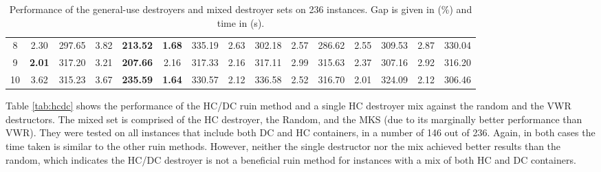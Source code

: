 \documentclass[preprint,11pt,3p]{elsarticle}
\begin{document}
\begin{table}[ht]
{\begin{tabular}{c c c c c c c c c c c c c c c}
    8 & 2.30 & 297.65 & 3.82 & \textbf{213.52} & \textbf{1.68} & 335.19 & 2.63 & 302.18 & 2.57 & 286.62 & 2.55 & 309.53 & 2.87 & 330.04 \\
    9 & \textbf{2.01} & 317.20 & 3.21 & \textbf{207.66} & 2.16 & 317.33 & 2.16 & 317.11 & 2.99 & 315.63 & 2.37 & 307.16 & 2.92 & 316.20 \\
    10 & 3.62 & 315.23 & 3.67 & \textbf{235.59} & \textbf{1.64} & 330.57 & 2.12 & 336.58 & 2.52 & 316.70 & 2.01 & 324.09 & 2.12 & 306.46 \\
    \hline
\end{tabular}
}
\caption[Performance of the general-use destroyers and mixed destroyer sets on 236 instances.]{Performance of the general-use destroyers and mixed destroyer sets on 236 instances. Gap is given in (\%) and time in (s).}
\label{tab:general}
\end{table}

Table \ref{tab:hcdc} shows the performance of the HC/DC ruin method and a single HC destroyer mix against the random and the VWR destructors. The mixed set is comprised of the HC destroyer, the Random, and the MKS (due to its marginally better performance than VWR). They were tested on all instances that include both DC and HC containers, in a number of 146 out of 236. Again, in both cases the time taken is similar to the other ruin methods. However, neither the single destructor nor the mix achieved better results than the random, which indicates the HC/DC destroyer is not a beneficial ruin method for instances with a mix of both HC and DC containers.
\end{document}
